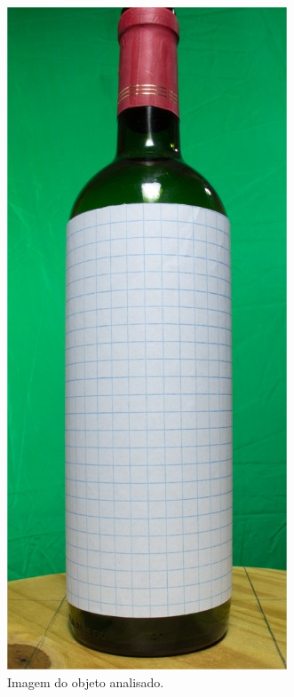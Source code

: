 \begin{figure}[ht]
    \caption{Imagem do objeto analisado.}
    \centering
    \vspace{.3cm}
    \begin{minipage}{.2\textwidth}
        \includegraphics[width=\textwidth]{TCC/Imagens/ensaios/quadriculado.jpg}
	\end{minipage}
    \label{fig:ensaio_1a}
\end{figure}

